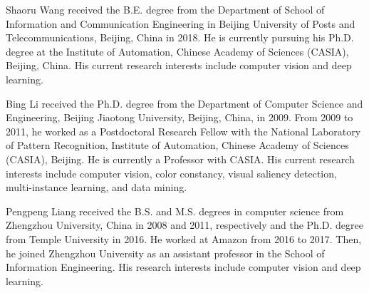 \documentclass[journal]{IEEEtran}
\begin{document}
\begin{IEEEbiography}
{Shaoru Wang}
received the B.E. degree from the Department of School of Information and Communication Engineering in Beijing University of Posts and Telecommunications, Beijing, China in 2018. He is currently pursuing his Ph.D. degree at the Institute of Automation, Chinese Academy of Sciences (CASIA), Beijing, China. His current research interests include computer vision and deep learning.
\end{IEEEbiography}

\begin{IEEEbiography}
{Bing Li}
received the Ph.D. degree from the Department of Computer Science and Engineering, Beijing Jiaotong University, Beijing, China, in 2009. From 2009 to 2011, he worked as a Postdoctoral Research Fellow with the National Laboratory of Pattern Recognition, Institute of Automation, Chinese Academy of Sciences (CASIA), Beijing. He is currently a Professor with CASIA. His current research interests include computer vision, color constancy, visual saliency detection, multi-instance learning, and data mining.
\end{IEEEbiography}

\begin{IEEEbiography}
{Pengpeng Liang}
received the B.S. and M.S. degrees in computer science from Zhengzhou University, China in 2008 and 2011, respectively and the Ph.D. degree from Temple University in 2016. He worked at Amazon from 2016 to 2017. Then, he joined Zhengzhou University as an assistant professor in the School of Information Engineering. His research interests include computer vision and deep learning.
\end{IEEEbiography}
\end{document}
